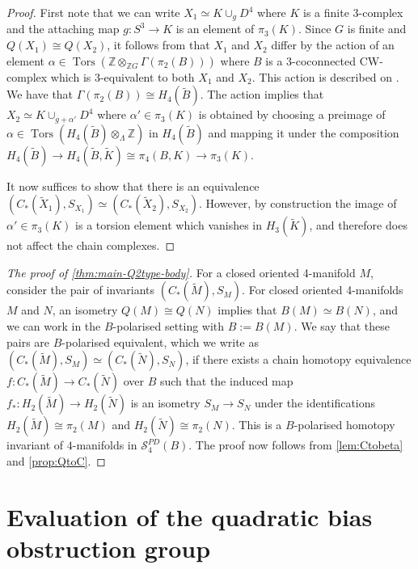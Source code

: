 \documentclass[11pt,a4paper,leqno]{amsart}
\theoremstyle{definition}
\theoremstyle{remark}
\newcommand{\wt}{\widetilde}
\newcommand{\Z}{\mathbb{Z}}
\DeclareMathOperator{\Tors}{Tors}
\renewcommand{\l}{\Lambda}
\begin{document}
\begin{proof}
First note that we can write $X_1 \simeq K \cup_g D^4$ where $K$ is a finite $3$-complex and the attaching map $g\colon  S^3 \to K$ is an element of $\pi_3(K)$.
Since $G$ is finite and $Q(X_1) \cong Q(X_2)$, it follows from \cite[Theorem 1.5]{KT21} that $X_1$ and $X_2$ differ by the action of an element $\alpha \in \Tors(\Z \otimes_{\Z G} \Gamma(\pi_2(B)))$ where $B$ is a 3-coconnected CW-complex which is 3-equivalent to both $X_1$ and $X_2$.
This action is described on \cite[p89-90]{Hambleton:1988}. We have that $\Gamma(\pi_2(B)) \cong H_4(\wt B)$. The action implies that $X_2 \simeq K \cup_{g+\alpha'} D^4$ where $\alpha' \in \pi_3(K)$ is obtained by choosing a preimage of 
$\alpha \in \Tors(H_4(\widetilde B) \otimes _\l \Z)$ in $H_4(\wt B)$ and mapping it under the composition $H_4(\wt B) \to H_4(\wt B, \wt K) \cong \pi_4(B, K) \to \pi_3(K)$. 

It now suffices to show that there is an equivalence $(C_*(\wt X_1), S_{X_1}) \simeq (C_*(\wt X_2), S_{X_2})$. However, by construction the image of $\alpha' \in \pi_3(K)$ is a torsion element which vanishes in $H_3(\widetilde K)$, and therefore does not affect the chain complexes. 
\end{proof}

\begin{proof}[The proof of \cref{thm:main-Q2type-body}]
For a closed oriented 4-manifold $M$, consider the pair of invariants $(C_*(\wt M), S_M)$.
For closed oriented 4-manifolds $M$ and $N$, an isometry $Q(M) \cong Q(N)$ implies that $B(M) \simeq B(N)$, and we can work in the $B$-polarised setting with $B:= B(M)$. We say that these pairs are $B$-polarised equivalent, which we write as $(C_*(\wt M), S_M) \simeq (C_*(\wt N), S_N)$, if there exists a chain homotopy equivalence $f\colon  C_*(\wt M) \to C_*(\wt N)$ over $B$ such that the induced map $f_*\colon  H_2(\wt M) \to H_2(\wt N)$ is an isometry $S_M \to S_N$ under the identifications $H_2(\wt M) \cong \pi_2(M)$ and $H_2(\wt N) \cong \pi_2(N)$.
This is a $B$-polarised homotopy invariant of $4$-manifolds in 
$\mathscr{S}^{PD}_4(B)$. The proof now follows from \cref{lem:Ctobeta} and \cref{prop:QtoC}.
\end{proof}

\section{Evaluation of the quadratic bias obstruction group}
\label{s:qbias_Lgroups}
\end{document}
